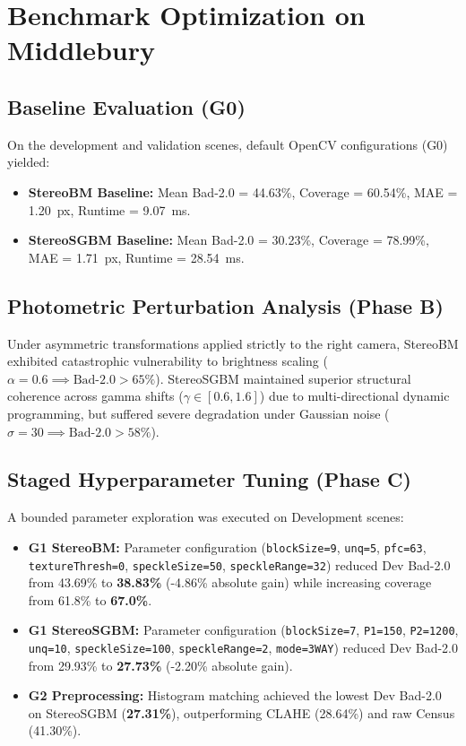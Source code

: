 \documentclass[journal]{IEEEtran}
\begin{document}
\section{Benchmark Optimization on Middlebury}
\subsection{Baseline Evaluation (G0)}
On the development and validation scenes, default OpenCV configurations (G0) yielded:
\begin{itemize}
    \item \textbf{StereoBM Baseline:} Mean Bad-2.0 = 44.63\%, Coverage = 60.54\%, MAE = 1.20~px, Runtime = 9.07~ms.
    \item \textbf{StereoSGBM Baseline:} Mean Bad-2.0 = 30.23\%, Coverage = 78.99\%, MAE = 1.71~px, Runtime = 28.54~ms.
\end{itemize}

\subsection{Photometric Perturbation Analysis (Phase B)}
Under asymmetric transformations applied strictly to the right camera, StereoBM exhibited catastrophic vulnerability to brightness scaling ($\alpha = 0.6 \implies \text{Bad-2.0} > 65\%$). StereoSGBM maintained superior structural coherence across gamma shifts ($\gamma \in [0.6, 1.6]$) due to multi-directional dynamic programming, but suffered severe degradation under Gaussian noise ($\sigma = 30 \implies \text{Bad-2.0} > 58\%$).

\subsection{Staged Hyperparameter Tuning (Phase C)}
A bounded parameter exploration was executed on Development scenes:
\begin{itemize}
    \item \textbf{G1 StereoBM:} Parameter configuration (\texttt{blockSize=9}, \texttt{unq=5}, \texttt{pfc=63}, \texttt{textureThresh=0}, \texttt{speckleSize=50}, \texttt{speckleRange=32}) reduced Dev Bad-2.0 from 43.69\% to \textbf{38.83\%} (-4.86\% absolute gain) while increasing coverage from 61.8\% to \textbf{67.0\%}.
    \item \textbf{G1 StereoSGBM:} Parameter configuration (\texttt{blockSize=7}, \texttt{P1=150}, \texttt{P2=1200}, \texttt{unq=10}, \texttt{speckleSize=100}, \texttt{speckleRange=2}, \texttt{mode=3WAY}) reduced Dev Bad-2.0 from 29.93\% to \textbf{27.73\%} (-2.20\% absolute gain).
    \item \textbf{G2 Preprocessing:} Histogram matching achieved the lowest Dev Bad-2.0 on StereoSGBM (\textbf{27.31\%}), outperforming CLAHE (28.64\%) and raw Census (41.30\%).
\end{itemize}
\end{document}
